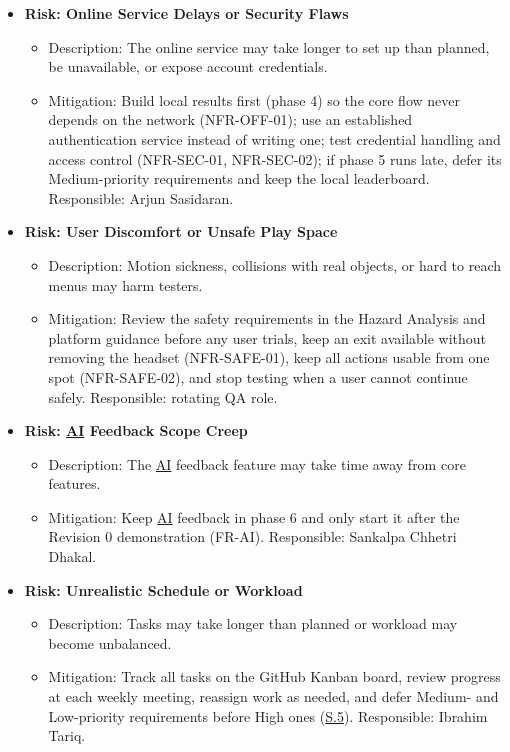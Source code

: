 \documentclass[12pt]{article}
\begin{document}
\begin{itemize}
\begin{itemize}
  the detailed design and test each one directly (FR-CHK, FR-PER).
  Responsible: Vikram Chandar and Arjun Sasidaran.
  \end{itemize}
\item \textbf{Risk: Online Service Delays or Security Flaws}
  \begin{itemize}
  \item Description: The online service may take longer to set up than
  planned, be unavailable, or expose account credentials.
  \item Mitigation: Build local results first (phase 4) so the core flow never
  depends on the network (NFR-OFF-01); use an established authentication
  service instead of writing one; test credential handling and access control
  (NFR-SEC-01, NFR-SEC-02); if phase 5 runs late, defer its Medium-priority
  requirements and keep the local leaderboard. Responsible: Arjun Sasidaran.
  \end{itemize}
\item \textbf{Risk: User Discomfort or Unsafe Play Space}
  \begin{itemize}
  \item Description: Motion sickness, collisions with real objects, or hard
  to reach menus may harm testers.
  \item Mitigation: Review the safety requirements in the Hazard Analysis
  and platform guidance before any user trials, keep an exit available
  without removing the headset (NFR-SAFE-01), keep all actions usable from one
  spot (NFR-SAFE-02), and stop testing when a user cannot continue safely.
  Responsible: rotating QA role.
  \end{itemize}
\item \textbf{Risk: \hyperlink{glos:AI}{AI} Feedback Scope Creep}
  \begin{itemize}
  \item Description: The \hyperlink{glos:AI}{AI} feedback feature may take time away from core
  features.
  \item Mitigation: Keep \hyperlink{glos:AI}{AI} feedback in phase 6 and only start it after the
  Revision 0 demonstration (FR-AI). Responsible: Sankalpa Chhetri Dhakal.
  \end{itemize}
\item \textbf{Risk: Unrealistic Schedule or Workload}
  \begin{itemize}
  \item Description: Tasks may take longer than planned or workload may
  become unbalanced.
  \item Mitigation: Track all tasks on the GitHub Kanban board, review
  progress at each weekly meeting, reassign work as needed, and defer Medium-
  and Low-priority requirements before High ones (\hyperref[s5]{S.5}).
  Responsible: Ibrahim Tariq.
  \end{itemize}
\end{itemize}
\end{document}
